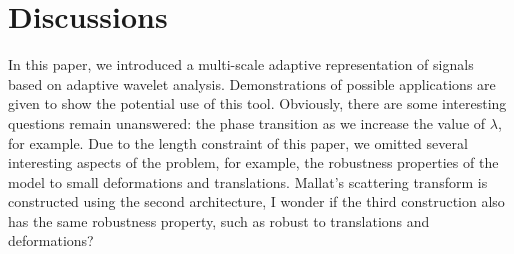 \documentclass[a4paper]{article}
\begin{document}
\section{Discussions}
In this paper, we introduced a multi-scale adaptive representation of signals based on adaptive wavelet analysis. Demonstrations of possible applications are given to show the potential use of this tool. Obviously, there are some interesting questions remain unanswered: the phase transition as we increase the value of $\lambda$, for example. Due to the length constraint of this paper, we omitted several interesting aspects of the problem, for example, the robustness properties of the model to small deformations and translations.
{\color{red} Mallat's scattering transform is constructed using the second architecture, I wonder if the third construction also has the same robustness property, such as robust to translations and deformations?}
\end{document}
